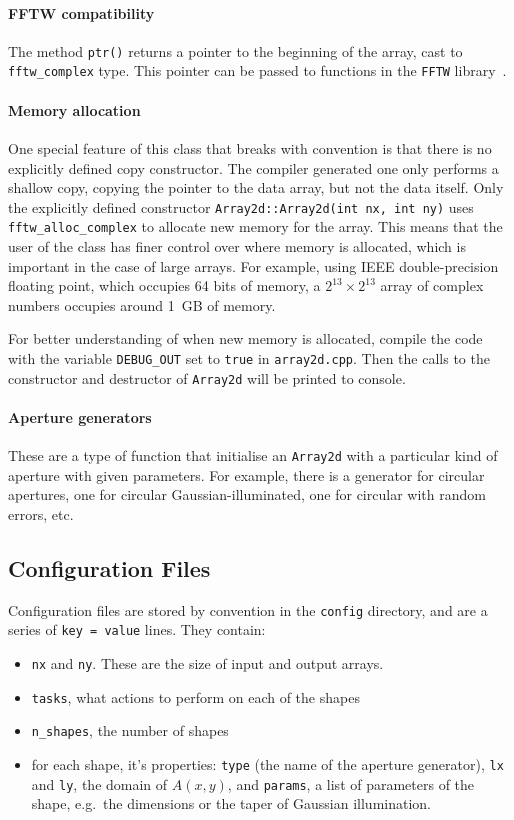 \documentclass[11pt]{article}
\begin{document}
\paragraph{FFTW compatibility} The method \texttt{ptr()} returns a pointer to the beginning of the array, cast to \texttt{fftw\_complex} type. This pointer can be passed to functions in the \texttt{FFTW} library~\cite[Section 4]{fftw}.

\paragraph{Memory allocation} One special feature of this class that breaks with convention is that there is no explicitly defined copy constructor. The compiler generated one only performs a shallow copy, copying the pointer to the data array, but not the data itself. Only the explicitly defined constructor \texttt{Array2d::Array2d(int nx, int ny)} uses \texttt{fftw\_alloc\_complex} to allocate new memory for the array. This means that the user of the class has finer control over where memory is allocated, which is important in the case of large arrays. For example, using IEEE double-precision floating point, which occupies 64 bits of memory, a $2^{13} \times 2^{13}$ array of complex numbers occupies around \SI{1}{GB} of memory.

For better understanding of when new memory is allocated, compile the code with the variable \texttt{DEBUG\_OUT} set to \texttt{true} in \texttt{array2d.cpp}. Then the calls to the constructor and destructor of \texttt{Array2d} will be printed to console.

\paragraph{Aperture generators} These are a type of function that initialise an \texttt{Array2d} with a particular kind of aperture with given parameters. For example, there is a generator for circular apertures, one for circular Gaussian-illuminated, one for circular with random errors, etc.

\subsection{Configuration Files}
Configuration files are stored by convention in the \texttt{config} directory, and are a series of \texttt{key = value} lines. They contain:
\begin{itemize}
    \item \texttt{nx} and \texttt{ny}. These are the size of input and output arrays.
    \item \texttt{tasks}, what actions to perform on each of the shapes
    \item \texttt{n\_shapes}, the number of shapes
    \item for each shape, it's properties: \texttt{type} (the name of the aperture generator), \texttt{lx} and \texttt{ly}, the domain of $A(x,y)$, and \texttt{params}, a list of parameters of the shape, e.g.\ the dimensions or the taper of Gaussian illumination.
\end{itemize}
\end{document}
